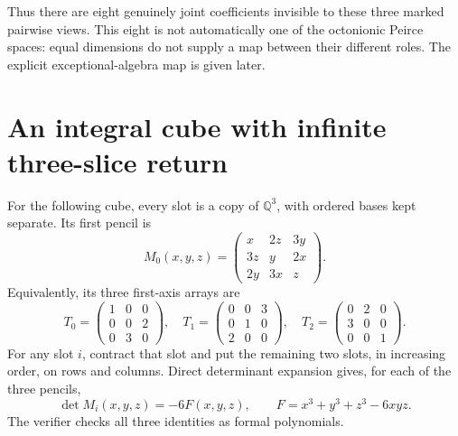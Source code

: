 \documentclass[11pt,reqno]{amsart}
\theoremstyle{definition}\newtheorem{definition}[theorem]{Definition}
\theoremstyle{remark}\newtheorem{remark}[theorem]{Remark}
\newcommand{\Q}{\mathbb Q}\newcommand{\R}{\mathbb R}\newcommand{\C}{\mathbb C}\newcommand{\Z}{\mathbb Z}\newcommand{\OO}{\mathbb O}
\begin{document}
Thus there are eight genuinely joint coefficients invisible to these three
marked pairwise views. This eight is not automatically one of the octonionic
Peirce spaces: equal dimensions do not supply a map between their different
roles. The explicit exceptional-algebra map is given later.

\section{An integral cube with infinite three-slice return}\label{sec:moore}

For the following cube, every slot is a copy of $\Q^3$, with ordered bases kept
separate. Its first pencil is
\[
 M_0(x,y,z)=
 \begin{pmatrix}x&2z&3y\\3z&y&2x\\2y&3x&z\end{pmatrix}.
\]
Equivalently, its three first-axis arrays are
\begin{equation}\label{eq:cube}
 T_0=\begin{pmatrix}1&0&0\\0&0&2\\0&3&0\end{pmatrix},\quad
 T_1=\begin{pmatrix}0&0&3\\0&1&0\\2&0&0\end{pmatrix},\quad
 T_2=\begin{pmatrix}0&2&0\\3&0&0\\0&0&1\end{pmatrix}.
\end{equation}
For any slot $i$, contract that slot and put the remaining two slots, in
increasing order, on rows and columns. Direct determinant expansion gives,
for each of the three pencils,
\begin{equation}\label{eq:hesse}
 \det M_i(x,y,z)=-6F(x,y,z),\qquad
 F=x^3+y^3+z^3-6xyz.
\end{equation}
The verifier checks all three identities as formal polynomials.
\end{document}
